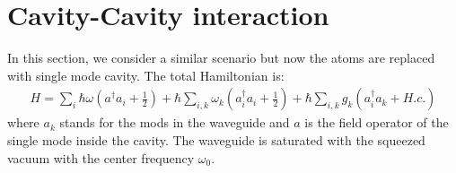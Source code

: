 \documentclass{article}
\begin{document}
\section{Cavity-Cavity interaction}
In this section, we consider a similar scenario but now the atoms are replaced with single mode cavity. The total Hamiltonian is:
\begin{equation}
\label{eq5}
\begin{split}
H=\sum_{i}\hbar\omega(a^{\dagger}a_{i}+\frac{1}{2})+\hbar\sum_{i,k}\omega_{k}(a_{i}^{\dagger}a_{i}+\frac{1}{2})+\hbar\sum_{i,k}g_{k}(a_{i}^{\dagger}a_{k}+H.c.)
\end{split}
\end{equation}
where $a_k$ stands for the mods in the waveguide and $a$ is the field operator of the single mode inside the cavity. The waveguide is saturated with the squeezed vacuum with the center frequency $\omega_0$. 
\end{document}
